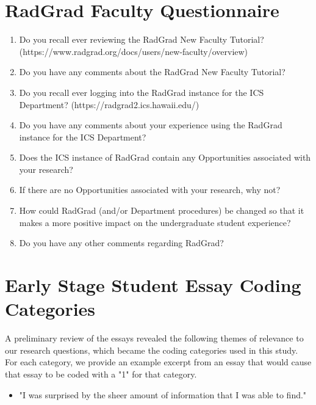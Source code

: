 \documentclass[acmsmall,nonacm]{acmart}
\begin{document}
\section{RadGrad Faculty Questionnaire}
\label{sec:faculty-questionnaire}

\begin{enumerate}[leftmargin=*]
\item Do you recall ever reviewing the RadGrad New Faculty Tutorial? \newline (https://www.radgrad.org/docs/users/new-faculty/overview)
\item Do you have any comments about the RadGrad New Faculty Tutorial?
\item Do you recall ever logging into the RadGrad instance for the ICS Department? \newline (https://radgrad2.ics.hawaii.edu/)
\item Do you have any comments about your experience using the RadGrad instance for the ICS Department?
\item Does the ICS instance of RadGrad contain any Opportunities associated with your research?
\item If there are no Opportunities associated with your research, why not?
\item How could RadGrad (and/or Department procedures) be changed so that it makes a more positive impact on the undergraduate student experience?
\item Do you have any other comments regarding RadGrad?
\end{enumerate}

\section{Early Stage Student Essay Coding Categories}
\label{sec:coding-categories}

A preliminary review of the essays revealed the following themes of relevance to our research questions, which became the coding categories used in this study.  For each category, we provide an example excerpt from an essay that would cause that essay to be coded with a "1" for that category.

\begin{itemize}
\item "I was surprised by the sheer amount of information that I was able to find."
\end{itemize}
\end{document}

